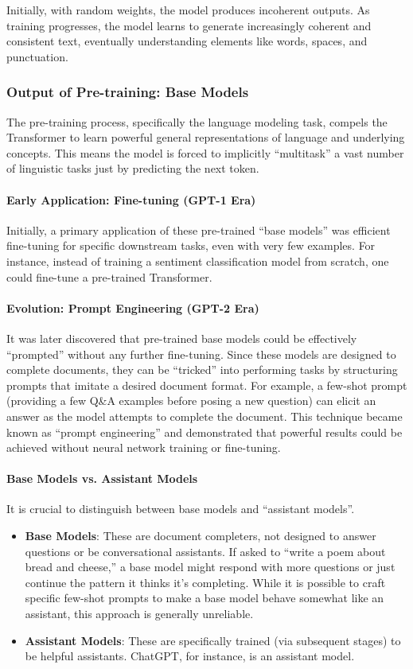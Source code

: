 Initially, with random weights, the model produces incoherent outputs. As training progresses, the model learns to generate increasingly coherent and consistent text, eventually understanding elements like words, spaces, and punctuation.

\subsubsection{Output of Pre-training: Base Models}

The pre-training process, specifically the language modeling task, compels the Transformer to learn powerful general representations of language and underlying concepts. This means the model is forced to implicitly ``multitask'' a vast number of linguistic tasks just by predicting the next token.

\paragraph{Early Application: Fine-tuning (GPT-1 Era)}
Initially, a primary application of these pre-trained ``base models'' was efficient fine-tuning for specific downstream tasks, even with very few examples. For instance, instead of training a sentiment classification model from scratch, one could fine-tune a pre-trained Transformer.

\paragraph{Evolution: Prompt Engineering (GPT-2 Era)}
It was later discovered that pre-trained base models could be effectively ``prompted'' without any further fine-tuning. Since these models are designed to complete documents, they can be ``tricked'' into performing tasks by structuring prompts that imitate a desired document format. For example, a few-shot prompt (providing a few Q\&A examples before posing a new question) can elicit an answer as the model attempts to complete the document. This technique became known as ``prompt engineering'' and demonstrated that powerful results could be achieved without neural network training or fine-tuning.

\paragraph{Base Models vs. Assistant Models}
It is crucial to distinguish between base models and ``assistant models''.
\begin{itemize}
    \item \textbf{Base Models}: These are document completers, not designed to answer questions or be conversational assistants. If asked to ``write a poem about bread and cheese,'' a base model might respond with more questions or just continue the pattern it thinks it's completing. While it is possible to craft specific few-shot prompts to make a base model behave somewhat like an assistant, this approach is generally unreliable.
    \item \textbf{Assistant Models}: These are specifically trained (via subsequent stages) to be helpful assistants. ChatGPT, for instance, is an assistant model.
\end{itemize}

